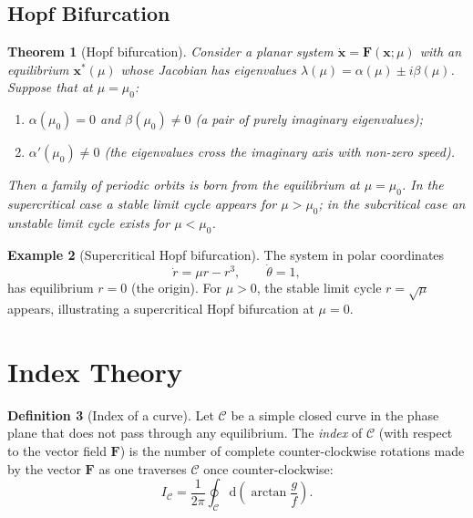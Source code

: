 \documentclass[12pt,a4paper,openany]{book}
\theoremstyle{definition}
\newtheorem{definition}{Definition}[chapter]
\newtheorem{example}[definition]{Example}
\theoremstyle{plain}
\newtheorem{theorem}[definition]{Theorem}
\theoremstyle{remark}
\newcommand{\dd}{\mathrm{d}}
\begin{document}
\subsection{Hopf Bifurcation}
\label{subsec:hopf}

\begin{theorem}[Hopf bifurcation]
\label{thm:hopf}
Consider a planar system
$\dot{\mathbf{x}}=\mathbf{F}(\mathbf{x};\mu)$ with an equilibrium
$\mathbf{x}^{*}(\mu)$ whose Jacobian has eigenvalues
$\lambda(\mu)=\alpha(\mu)\pm i\beta(\mu)$. Suppose that at
$\mu=\mu_{0}$:
\begin{enumerate}[label=(\roman*)]
  \item $\alpha(\mu_{0})=0$ and $\beta(\mu_{0})\neq 0$
    (a pair of purely imaginary eigenvalues);
  \item $\alpha'(\mu_{0})\neq 0$
    (the eigenvalues cross the imaginary axis with non-zero speed).
\end{enumerate}
Then a family of periodic orbits is born from the equilibrium at
$\mu=\mu_{0}$. In the \emph{supercritical}
case a stable limit cycle appears for
$\mu>\mu_{0}$; in the \emph{subcritical}
case an unstable limit cycle exists for $\mu<\mu_{0}$.
\end{theorem}

\begin{example}[Supercritical Hopf bifurcation]
\label{ex:hopf-super}
The system in polar coordinates
\[
  \dot{r} = \mu r - r^{3}, \qquad \dot{\theta} = 1,
\]
has equilibrium $r=0$ (the origin). For $\mu>0$, the stable limit
cycle $r=\sqrt{\mu}$ appears, illustrating a supercritical Hopf
bifurcation at $\mu=0$.
\end{example}

\section{Index Theory}
\label{sec:index-theory}

\begin{definition}[Index of a curve]
\label{def:index-curve}
Let $\mathcal{C}$ be a simple closed curve in the phase plane that
does not pass through any equilibrium. The \emph{index} of
$\mathcal{C}$ (with respect to the vector field $\mathbf{F}$) is the
number of complete counter-clockwise rotations made by the vector
$\mathbf{F}$ as one traverses $\mathcal{C}$ once counter-clockwise:
\[
  I_{\mathcal{C}}
  = \frac{1}{2\pi}\oint_{\mathcal{C}}\dd\!\left(\arctan\frac{g}{f}\right).
\]
\end{definition}
\end{document}
